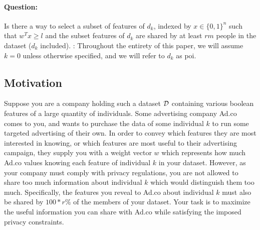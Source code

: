 \documentclass[12pt]{article}
\begin{document}
\paragraph{Question:}
Is there a way to select a subset of features of $d_k$, indexed by $x\in \{0,1\}^n$ such that $w^T x \geq l$ and the subset features of $d_k$ are shared by at least $rm$ people in the dataset ($d_k$ included). : Throughout the entirety of this paper, we will assume $k = 0$ unless otherwise specified, and we will refer to $d_k$ as \gls{poi}.
\subsection{Motivation}
Suppose you are a company holding such a dataset $\mathcal{D}$ containing various boolean features of a large quantity of individuals. Some advertising company Ad.co comes to you, and wants to purchase the data of some individual $k$ to run some targeted advertising of their own. In order to convey which features they are most interested in knowing, or which features are most useful to their advertising campaign, they supply you with a weight vector $w$ which represents how much Ad.co values knowing each feature of individual $k$ in your dataset. However, as your company must comply with privacy regulations, you are not allowed to share too much information about individual $k$ which would distinguish them too much. Specifically, the features you reveal to Ad.co about individual $k$ must also be shared by $100 * r\%$ of the members of your dataset. Your task is to maximize the useful information you can share with Ad.co while satisfying the imposed privacy constraints.
\end{document}
